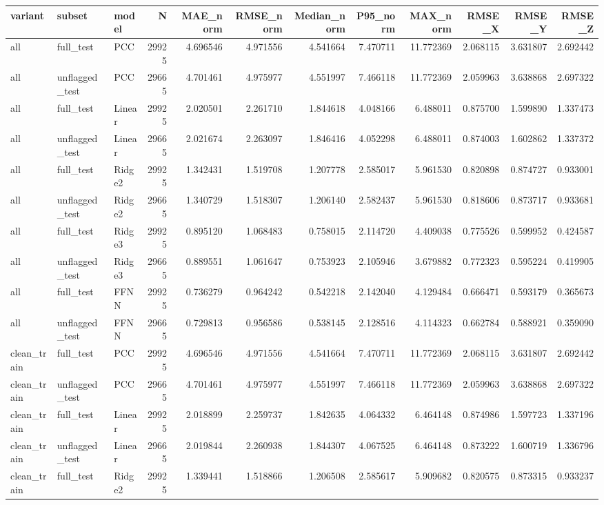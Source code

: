 \begin{tabular}{lllrrrrrrrrr}
\toprule
variant & subset & model & N & MAE_norm & RMSE_norm & Median_norm & P95_norm & MAX_norm & RMSE_X & RMSE_Y & RMSE_Z \\
\midrule
all & full_test & PCC & 29925 & 4.696546 & 4.971556 & 4.541664 & 7.470711 & 11.772369 & 2.068115 & 3.631807 & 2.692442 \\
all & unflagged_test & PCC & 29665 & 4.701461 & 4.975977 & 4.551997 & 7.466118 & 11.772369 & 2.059963 & 3.638868 & 2.697322 \\
all & full_test & Linear & 29925 & 2.020501 & 2.261710 & 1.844618 & 4.048166 & 6.488011 & 0.875700 & 1.599890 & 1.337473 \\
all & unflagged_test & Linear & 29665 & 2.021674 & 2.263097 & 1.846416 & 4.052298 & 6.488011 & 0.874003 & 1.602862 & 1.337372 \\
all & full_test & Ridge2 & 29925 & 1.342431 & 1.519708 & 1.207778 & 2.585017 & 5.961530 & 0.820898 & 0.874727 & 0.933001 \\
all & unflagged_test & Ridge2 & 29665 & 1.340729 & 1.518307 & 1.206140 & 2.582437 & 5.961530 & 0.818606 & 0.873717 & 0.933681 \\
all & full_test & Ridge3 & 29925 & 0.895120 & 1.068483 & 0.758015 & 2.114720 & 4.409038 & 0.775526 & 0.599952 & 0.424587 \\
all & unflagged_test & Ridge3 & 29665 & 0.889551 & 1.061647 & 0.753923 & 2.105946 & 3.679882 & 0.772323 & 0.595224 & 0.419905 \\
all & full_test & FFNN & 29925 & 0.736279 & 0.964242 & 0.542218 & 2.142040 & 4.129484 & 0.666471 & 0.593179 & 0.365673 \\
all & unflagged_test & FFNN & 29665 & 0.729813 & 0.956586 & 0.538145 & 2.128516 & 4.114323 & 0.662784 & 0.588921 & 0.359090 \\
clean_train & full_test & PCC & 29925 & 4.696546 & 4.971556 & 4.541664 & 7.470711 & 11.772369 & 2.068115 & 3.631807 & 2.692442 \\
clean_train & unflagged_test & PCC & 29665 & 4.701461 & 4.975977 & 4.551997 & 7.466118 & 11.772369 & 2.059963 & 3.638868 & 2.697322 \\
clean_train & full_test & Linear & 29925 & 2.018899 & 2.259737 & 1.842635 & 4.064332 & 6.464148 & 0.874986 & 1.597723 & 1.337196 \\
clean_train & unflagged_test & Linear & 29665 & 2.019844 & 2.260938 & 1.844307 & 4.067525 & 6.464148 & 0.873222 & 1.600719 & 1.336796 \\
clean_train & full_test & Ridge2 & 29925 & 1.339441 & 1.518866 & 1.206508 & 2.585617 & 5.909682 & 0.820575 & 0.873315 & 0.933237 \\

\end{tabular}
